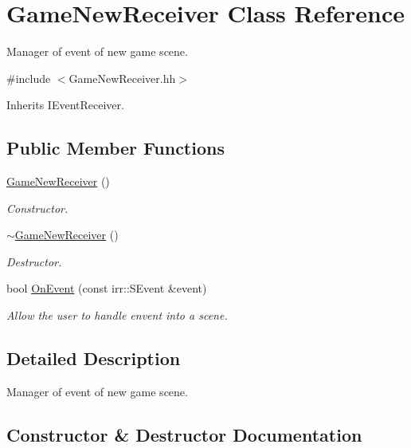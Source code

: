 \hypertarget{classGameNewReceiver}{}\section{Game\+New\+Receiver Class Reference}
\label{classGameNewReceiver}


Manager of event of new game scene.  




{\ttfamily \#include $<$Game\+New\+Receiver.\+hh$>$}



Inherits I\+Event\+Receiver.

\subsection*{Public Member Functions}
\begin{DoxyCompactItemize}
\item 
\hyperlink{classGameNewReceiver_a8f506ac1b4d6841b446ad239b615c079}{Game\+New\+Receiver} ()
\begin{DoxyCompactList}\small\item\em Constructor. \end{DoxyCompactList}\item 
\hyperlink{classGameNewReceiver_ab92b6653b56d291853a4e2f737eaf6fd}{$\sim$\+Game\+New\+Receiver} ()
\begin{DoxyCompactList}\small\item\em Destructor. \end{DoxyCompactList}\item 
bool \hyperlink{classGameNewReceiver_ad9ec097d8b46946ed1a21c24463fc0b6}{On\+Event} (const irr\+::\+S\+Event \&event)
\begin{DoxyCompactList}\small\item\em Allow the user to handle envent into a scene. \end{DoxyCompactList}\end{DoxyCompactItemize}


\subsection{Detailed Description}
Manager of event of new game scene. 

\subsection{Constructor \& Destructor Documentation}
\mbox{\label{classGameNewReceiver_a8f506ac1b4d6841b446ad239b615c079}} 

